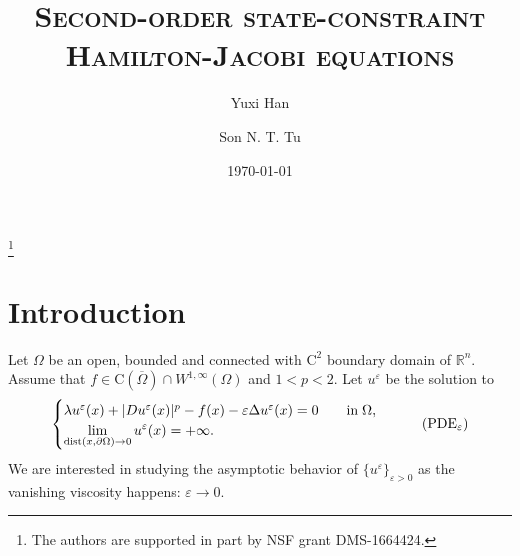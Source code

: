 \documentclass[11pt,reqno]{amsart}
\numberwithin{figure}{section}
\theoremstyle{plain}
\theoremstyle{remark}
\numberwithin{equation}{section}
\begin{document}
\title[Rate of convergence]
{\textsc{Second-order state-constraint Hamilton-Jacobi equations}}




\thanks{The authors are supported in part by NSF grant DMS-1664424.}

\begin{abstract}

\end{abstract}




\author{Yuxi Han}
\address[Y. Han]
{
Department of Mathematics, 
University of Wisconsin Madison, 480 Lincoln  Drive, Madison, WI 53706, USA}



\author{Son N. T. Tu}
\address[S. N.T. Tu]
{
Department of Mathematics, 
University of Wisconsin Madison, 480 Lincoln  Drive, Madison, WI 53706, USA}

\date{\today}


\maketitle










\section{Introduction}\label{sec:intro}

Let $\Omega$ be an open, bounded and connected with $\mathrm{C}^2$ boundary domain of $\mathbb{R}^n$. Assume that $f\in \mathrm{C}(\overline{\Omega})\cap W^{1,\infty}(\Omega)$ and $1<p<2$. Let $u^\varepsilon$ be the solution to 
\begin{equation}\label{eq:PDE}
    \begin{cases}
    \lambda u^\varepsilon(x) + |Du^\varepsilon(x)|^p - f(x) - \varepsilon \Delta u^\varepsilon(x) = 0 \qquad
    \text{in}\;\Omega, \vspace{0cm}\\
    \displaystyle  \lim_{\mathrm{dist}(x,\partial \Omega)\to 0} u^\varepsilon(x) = +\infty.
    \end{cases} \tag{PDE$_\varepsilon$}
\end{equation}
We are interested in studying the asymptotic behavior of $\{u^\varepsilon\}_{\varepsilon>0}$ as the vanishing viscosity happens: $\varepsilon\rightarrow 0$.
\end{document}
